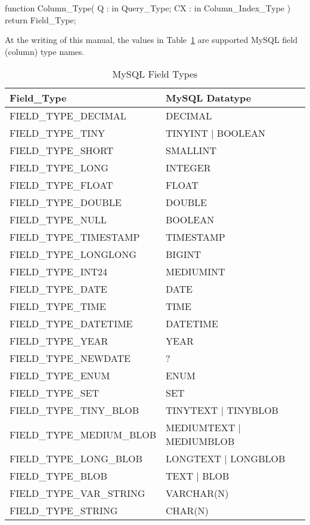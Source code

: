 \documentclass[english,letterpaper]{book}
\begin{document}
\begin{Code}
function Column_Type(
   Q :  in Query_Type;
   CX : in Column_Index_Type
) return Field_Type;
\end{Code}

At the writing of this manual, the values in Table~\ref{t:mysqlftyp}
are supported MySQL field (column) type names.

\begin{table}
   \begin{center}
      \begin{tabular}{ll}
         Field\_Type                &  MySQL Datatype\\
         \hline 
         FIELD\_TYPE\_DECIMAL       &  DECIMAL\\
         FIELD\_TYPE\_TINY          &  TINYINT | BOOLEAN\\
         FIELD\_TYPE\_SHORT         &  SMALLINT\\
         FIELD\_TYPE\_LONG          &  INTEGER\\
         FIELD\_TYPE\_FLOAT         &  FLOAT\\
         FIELD\_TYPE\_DOUBLE        &  DOUBLE\\
         FIELD\_TYPE\_NULL          &  BOOLEAN\\
         FIELD\_TYPE\_TIMESTAMP     &  TIMESTAMP\\
         FIELD\_TYPE\_LONGLONG      &  BIGINT\\
         FIELD\_TYPE\_INT24         &  MEDIUMINT\\
         FIELD\_TYPE\_DATE          &  DATE\\
         FIELD\_TYPE\_TIME          &  TIME\\
         FIELD\_TYPE\_DATETIME      &  DATETIME\\
         FIELD\_TYPE\_YEAR          &  YEAR\\
         FIELD\_TYPE\_NEWDATE       &  ?\\
         FIELD\_TYPE\_ENUM          &  ENUM\\
         FIELD\_TYPE\_SET           &  SET\\
         FIELD\_TYPE\_TINY\_BLOB    &  TINYTEXT | TINYBLOB\\
         FIELD\_TYPE\_MEDIUM\_BLOB  &  MEDIUMTEXT | MEDIUMBLOB\\
         FIELD\_TYPE\_LONG\_BLOB    &  LONGTEXT | LONGBLOB\\
         FIELD\_TYPE\_BLOB          &  TEXT | BLOB\\
         FIELD\_TYPE\_VAR\_STRING   &  VARCHAR(N)\\
         FIELD\_TYPE\_STRING        &  CHAR(N)\\
      \end{tabular}
   \end{center}
   \caption{MySQL Field Types}\label{t:mysqlftyp}
\end{table}
\end{document}
